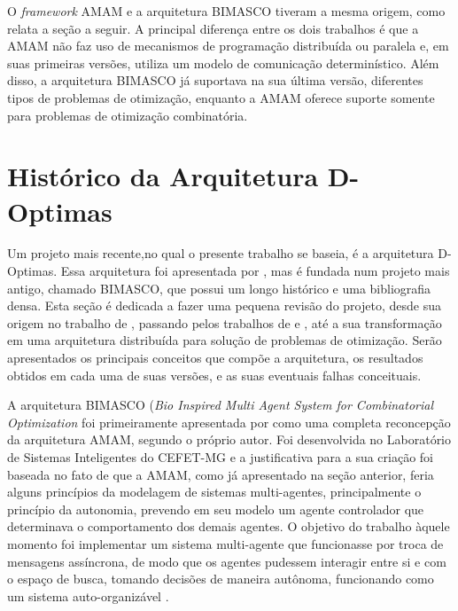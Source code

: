 O \textit{framework} AMAM e a arquitetura BIMASCO tiveram a mesma origem, como relata a seção a seguir. A principal diferença entre os dois trabalhos é que a AMAM não faz uso de mecanismos de programação distribuída ou paralela e, em suas primeiras versões, utiliza um modelo de comunicação determinístico. Além disso, a arquitetura BIMASCO já suportava na sua última versão, diferentes tipos de problemas de otimização, enquanto a AMAM  oferece suporte somente para problemas de otimização combinatória.

\section{Histórico da Arquitetura D-Optimas}
\label{sec:histBimasco}

Um projeto mais recente,no qual o presente trabalho se baseia, é a arquitetura D-Optimas. Essa arquitetura foi apresentada por , mas é fundada num projeto mais antigo, chamado BIMASCO, que possui um longo histórico e uma bibliografia densa. Esta seção é dedicada a fazer uma pequena revisão do projeto, desde sua origem no trabalho de , passando pelos trabalhos de  e , até a sua transformação em uma arquitetura distribuída para solução de problemas de otimização. Serão apresentados os principais conceitos que compõe a arquitetura, os resultados obtidos em cada uma de suas versões, e as suas eventuais falhas conceituais.

A arquitetura BIMASCO (\textit{Bio Inspired Multi Agent System for Combinatorial Optimization} foi primeiramente apresentada por  como uma completa reconcepção da arquitetura AMAM, segundo o próprio autor. Foi desenvolvida no Laboratório de Sistemas Inteligentes do CEFET-MG e a justificativa para a sua criação foi baseada no fato de que a AMAM, como já apresentado na seção anterior, feria alguns princípios da modelagem de sistemas multi-agentes, principalmente o princípio da autonomia, prevendo em seu modelo um agente controlador que determinava o comportamento dos demais agentes. O objetivo do trabalho àquele momento foi implementar um sistema multi-agente que funcionasse por troca de mensagens assíncrona, de modo que os agentes pudessem interagir entre si e com o espaço de busca, tomando decisões de maneira autônoma, funcionando como um sistema auto-organizável \cite{saliba2010}. 

